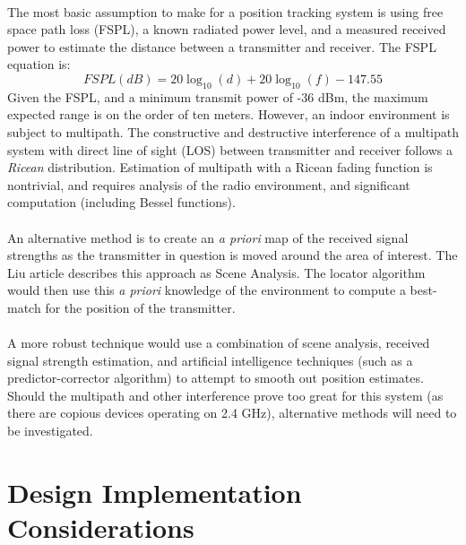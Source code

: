 \documentclass{article}
\begin{document}
\paragraph*{}
The most basic assumption to make for a position tracking system is using free space path loss (FSPL), a known radiated power level, and a measured received power to estimate the distance between a transmitter and receiver.  The FSPL equation is:
\begin{equation}
FSPL(dB) = 20\log_{10}(d) + 20\log_{10}(f) - 147.55
\end{equation}
Given the FSPL, and a minimum transmit power of -36 dBm, the maximum expected range is on the order of ten meters.  However, an indoor environment is subject to multipath.  The constructive and destructive interference of a multipath system with direct line of sight (LOS) between transmitter and receiver follows a \textit{Ricean} distribution.  Estimation of multipath with a Ricean fading function is nontrivial, and requires analysis of the radio environment, and significant computation (including Bessel functions).
\paragraph*{}
An alternative method is to create an \textit{a priori} map of the received signal strengths as the transmitter in question is moved around the area of interest.  The Liu article describes this approach as Scene Analysis.  The locator algorithm would then use this \textit{a priori} knowledge of the environment to compute a best-match for the position of the transmitter.
\paragraph*{}
A more robust technique would use a combination of scene analysis, received signal strength estimation, and artificial intelligence techniques (such as a predictor-corrector algorithm) to attempt to smooth out position estimates.  Should the multipath and other interference prove too great for this system (as there are copious devices operating on 2.4 GHz), alternative methods will need to be investigated.

\section*{Design Implementation Considerations}
\end{document}
